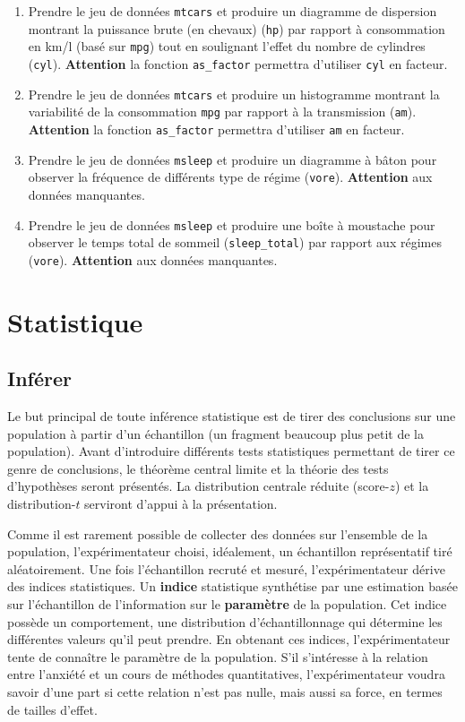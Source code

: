 \documentclass[
]{book}
\begin{document}
\begin{enumerate}
\def\labelenumi{\arabic{enumi}.}
\item
  Prendre le jeu de données \texttt{mtcars} et produire un diagramme de dispersion montrant la puissance brute (en chevaux) (\texttt{hp}) par rapport à consommation en km/l (basé sur \texttt{mpg}) tout en soulignant l'effet du nombre de cylindres (\texttt{cyl}). \textbf{Attention} la fonction \texttt{as\_factor} permettra d'utiliser \texttt{cyl} en facteur.
\item
  Prendre le jeu de données \texttt{mtcars} et produire un histogramme montrant la variabilité de la consommation \texttt{mpg} par rapport à la transmission (\texttt{am}). \textbf{Attention} la fonction \texttt{as\_factor} permettra d'utiliser \texttt{am} en facteur.
\item
  Prendre le jeu de données \texttt{msleep} et produire un diagramme à bâton pour observer la fréquence de différents type de régime (\texttt{vore}). \textbf{Attention} aux données manquantes.
\item
  Prendre le jeu de données \texttt{msleep} et produire une boîte à moustache pour observer le temps total de sommeil (\texttt{sleep\_total}) par rapport aux régimes (\texttt{vore}). \textbf{Attention} aux données manquantes.
\end{enumerate}

\hypertarget{part-statistique}{%
\part{Statistique}\label{part-statistique}}

\hypertarget{infuxe9rer}{%
\chapter{Inférer}\label{infuxe9rer}}

Le but principal de toute inférence statistique est de tirer des conclusions sur une population à partir d'un échantillon (un fragment beaucoup plus petit de la population). Avant d'introduire différents tests statistiques permettant de tirer ce genre de conclusions, le théorème central limite et la théorie des tests d'hypothèses seront présentés. La distribution centrale réduite (score-\(z\)) et la distribution-\(t\) serviront d'appui à la présentation.

Comme il est rarement possible de collecter des données sur l'ensemble de la population, l'expérimentateur choisi, idéalement, un échantillon représentatif tiré aléatoirement. Une fois l'échantillon recruté et mesuré, l'expérimentateur dérive des indices statistiques. Un \textbf{indice} statistique synthétise par une estimation basée sur l'échantillon de l'information sur le \textbf{paramètre} de la population. Cet indice possède un comportement, une distribution d'échantillonnage qui détermine les différentes valeurs qu'il peut prendre. En obtenant ces indices, l'expérimentateur tente de connaître le paramètre de la population. S'il s'intéresse à la relation entre l'anxiété et un cours de méthodes quantitatives, l'expérimentateur voudra savoir d'une part si cette relation n'est pas nulle, mais aussi sa force, en termes de tailles d'effet.
\end{document}
